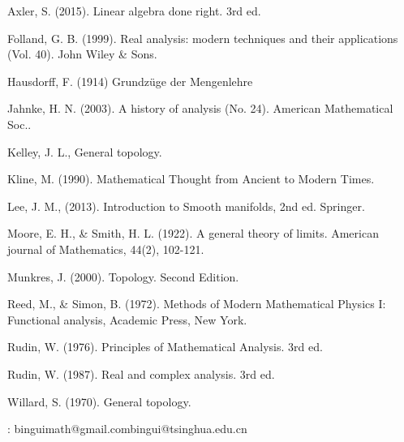 \documentclass[12pt,b5paper,notitlepage]{article}
\theoremstyle{definition}
\theoremstyle{plain}
\numberwithin{equation}{section}
\begin{document}
	\begin{thebibliography}{999999}
		\footnotesize	

Axler, S. (2015). Linear algebra done right. 3rd ed.

Folland, G. B. (1999). Real analysis: modern techniques and their applications (Vol. 40). John Wiley \& Sons.


Hausdorff, F. (1914) Grundz\"uge der Mengenlehre

Jahnke, H. N. (2003). A history of analysis (No. 24). American Mathematical Soc..


Kelley, J. L., General topology. 

Kline, M. (1990). Mathematical Thought from Ancient to Modern Times.

Lee, J. M., (2013). Introduction to Smooth manifolds, 2nd ed. Springer.

Moore, E. H., \& Smith, H. L. (1922). A general theory of limits. American journal of Mathematics, 44(2), 102-121.

Munkres, J. (2000). Topology. Second Edition.


Reed, M., \& Simon, B. (1972). Methods of Modern Mathematical Physics I: Functional analysis, Academic Press, New York.


Rudin, W. (1976). Principles of Mathematical Analysis. 3rd ed.

Rudin, W. (1987). Real and complex analysis. 3rd ed. 


Willard, S. (1970). General topology. 

		
\end{thebibliography}


: binguimath@gmail.com\qquad bingui@tsinghua.edu.cn
\end{document}
